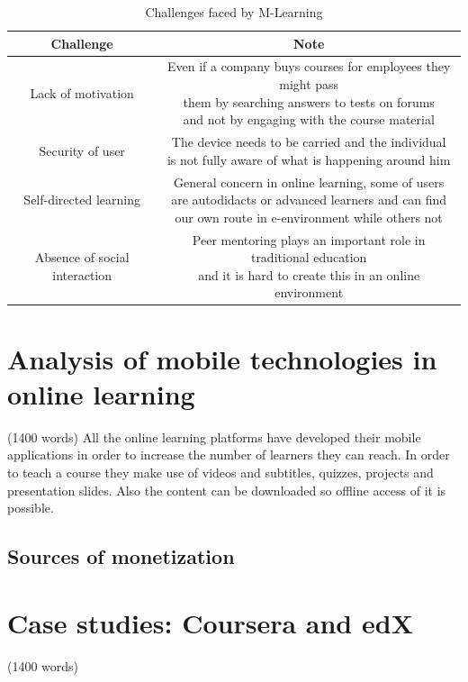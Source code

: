 \documentclass[11]{article}
\begin{document}
\begin{table}[H]
	\centering
	\caption{Challenges faced by M-Learning}
	\label{mLearChall}
	\begin{tabular}{|c|c|}
		\hline
		\textbf{ Challenge } & \textbf{Note}  \\
		\hline
		Lack of motivation & \makecell { Even if a company buys courses for employees they might pass\\ them by searching answers to tests on forums\\ and not by engaging with the course material}  \\	
		\hline
		Security of user & \makecell{The device needs to be carried and the individual\\ is not fully aware of what is happening around him}  \\	
		\hline
		Self-directed learning & \makecell{General concern in online learning, some of users\\ are autodidacts or advanced learners and can find\\ our own route in e-environment while others not}  \\	
		\hline
		Absence of social interaction & \makecell{Peer mentoring plays an important role in traditional education\\ and it is hard to create this in an online environment}\\
		\hline
	\end{tabular}
\end{table}

\newpage
\section{Analysis of mobile technologies in online learning}(1400 words)
	All the online learning platforms have developed their mobile applications in order to increase the number of learners they can reach. In order to teach a course they make use of videos and subtitles, quizzes, projects and presentation slides. Also the content can be downloaded so offline access of it is possible. 

	\subsection{Sources of monetization}

	
\section{Case studies: Coursera and edX}(1400 words)
\end{document}
